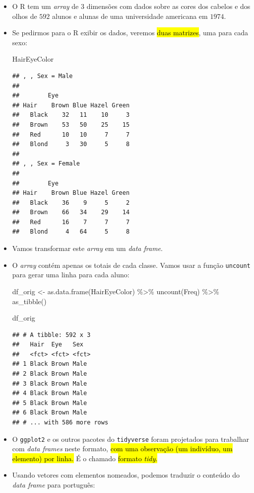 \documentclass[
  11pt]{report}
\newenvironment{Shaded}{\begin{snugshade}}{\end{snugshade}}
\newcommand{\FunctionTok}[1]{\textcolor[rgb]{0.00,0.00,0.00}{#1}}
\newcommand{\NormalTok}[1]{#1}
\newcommand{\OtherTok}[1]{\textcolor[rgb]{0.56,0.35,0.01}{#1}}
\newcommand{\SpecialCharTok}[1]{\textcolor[rgb]{0.00,0.00,0.00}{#1}}
\renewenvironment{Shaded}{
    \begin{mdframed}[%
      roundcorner=2pt,%
      innerleftmargin=5pt,%
      innerrightmargin=5pt,%
      topline=true,%
      leftline=true,%
      rightline=true,%
      bottomline=true,%
      linewidth=0.5pt,%
      linecolor=black!20,%
      backgroundcolor=black!2,%
      skipabove=2ex,%
      skipbelow=2.5ex%
    ]%
  }
  {
    \end{mdframed}
  }
\begin{document}
\begin{itemize}
\item
  O R tem um \emph{array} de $3$ dimensões com dados sobre as cores dos cabelos e dos olhos de $592$ alunos e alunas de uma universidade americana em $1974$.
\item
  Se pedirmos para o R exibir os dados, veremos {\hl{duas matrizes}}, uma para cada sexo:

\begin{Shaded}
\begin{Highlighting}[]
\NormalTok{HairEyeColor}
\end{Highlighting}
\end{Shaded}

\begin{verbatim}
## , , Sex = Male
## 
##        Eye
## Hair    Brown Blue Hazel Green
##   Black    32   11    10     3
##   Brown    53   50    25    15
##   Red      10   10     7     7
##   Blond     3   30     5     8
## 
## , , Sex = Female
## 
##        Eye
## Hair    Brown Blue Hazel Green
##   Black    36    9     5     2
##   Brown    66   34    29    14
##   Red      16    7     7     7
##   Blond     4   64     5     8
\end{verbatim}
\item
  Vamos transformar este \emph{array} em um \emph{data frame}.
\item
  O \emph{array} contém apenas os totais de cada classe. Vamos usar a função \texttt{uncount} para gerar uma linha para cada aluno:

\begin{Shaded}
\begin{Highlighting}[]
\NormalTok{df\_orig }\OtherTok{\textless{}{-}} \FunctionTok{as.data.frame}\NormalTok{(HairEyeColor) }\SpecialCharTok{\%\textgreater{}\%} 
  \FunctionTok{uncount}\NormalTok{(Freq) }\SpecialCharTok{\%\textgreater{}\%} 
  \FunctionTok{as\_tibble}\NormalTok{()}

\NormalTok{df\_orig}
\end{Highlighting}
\end{Shaded}

\begin{verbatim}
## # A tibble: 592 x 3
##   Hair  Eye   Sex  
##   <fct> <fct> <fct>
## 1 Black Brown Male 
## 2 Black Brown Male 
## 3 Black Brown Male 
## 4 Black Brown Male 
## 5 Black Brown Male 
## 6 Black Brown Male 
## # ... with 586 more rows
\end{verbatim}
\item
  O \texttt{ggplot2} e os outros pacotes do \texttt{tidyverse} foram projetados para trabalhar com \emph{data frames} neste formato, {\hl{com uma observação (um indivíduo, um elemento) por linha.}} É o chamado {\hl{formato \emph{tidy}.}}
\item
  Usando vetores com elementos nomeados, podemos traduzir o conteúdo do \emph{data frame} para português:


\end{itemize}
\end{document}
